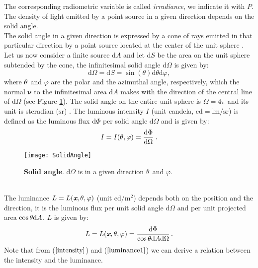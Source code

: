 The corresponding radiometric variable is called \textit{irradiance}, we indicate it with $P$. The density of light emitted by a point source in a given direction depends on the solid angle.\\ \indent
The solid angle in a given direction is expressed by a cone of rays emitted in that particular direction by a point source located at the center of the unit sphere \cite{koshel2012illumination}. Let us now consider a finite source $\textrm{d}A$ and let $\textrm{d}S$ be the area on the unit sphere subtended by the cone,
the infinitesimal solid angle $\textrm{d}\Omega$ is given by:
\begin{equation}\label{solid_angle}
\textrm{d}\Omega = \textrm{d}S= \sin(\theta)\textrm{d}\theta \textrm{d}\varphi,
\end{equation}
 where $\theta$ and $\varphi$ are the polar and the azimuthal angle, respectively, which the normal $\boldsymbol{\nu}$ to the infinitesimal area $\textrm{d}A$ makes with the direction of the central line of $\textrm{d}\Omega$ (see Figure \ref{fig:rad}).
The solid angle on the entire unit sphere is $\Omega = 4\pi$ and its unit is steradian ($\textrm{sr}$) \cite{arecchi2007field}.
The luminous intensity $I$ (unit candela, $\textrm{cd}=\textrm{lm}/\textrm{sr}$) is defined as the luminous flux $\textrm{d}\Phi$ per solid angle
$\textrm{d}\Omega$ and is given by:
\begin{equation}\label{intensity}
I = I(\theta, \varphi) = \frac{\textrm{d}\Phi}{\textrm{d}\Omega}\;.
\end{equation}
 \begin{figure}[t]
  \begin{center}
  \texttt{[image: SolidAngle]}
  \end{center}
  \caption{\textbf{Solid angle}. $\textrm{d}\Omega$ is in a given direction $\theta$ and $\varphi$.}
  \label{fig:rad}
  \end{figure}
\\ \indent 
The luminance $L = L(\textit{\textbf{x}}, \theta, \varphi)$ (unit $\textrm{cd} / \textrm{m}^2$) depends both on the position and the direction, it is the luminous flux per unit solid angle $\textrm{d}\Omega$ and  per unit projected area $\cos\theta \textrm{d}A$.  $L$  is given by:
\begin{equation}\label{luminance1}
  L=L(\textit{\textbf{x}}, \theta, \varphi) = \frac{\textrm{d}\Phi}{\cos\theta\textrm{d}A\textrm{d}\Omega}\,.
\end{equation}
\noindent Note that from ($\ref{intensity}$) and ($\ref{luminance1}$) we can derive a relation between the intensity and the luminance. 
